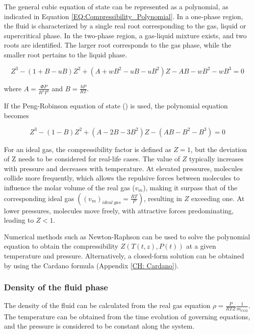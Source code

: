 \documentclass[a4paper,fleqn]{cas-dc}
\begin{document}
The general cubic equation of state can be represented as a polynomial, as indicated in Equation \ref{EQ:Compressibility_Polynomial}. In a one-phase region, the fluid is characterized by a single real root corresponding to the gas, liquid or supercritical phase. In the two-phase region, a gas-liquid mixture exists, and two roots are identified. The larger root corresponds to the gas phase, while the smaller root pertains to the liquid phase.

{\footnotesize
	\begin{equation}
		\label{EQ:Compressibility_Polynomial}
		Z^3 - (1+B-uB)Z^2+(A+wB^2-uB-uB^2)Z - AB - wB^2 - wB^3 = 0
\end{equation} }

where $A=\frac{\Phi P}{R^2T^2}$ and $B=\frac{bP}{RT}$.

If the Peng-Robinson equation of state (\citet{Peng1976}) is used, the polynomial equation becomes

{\footnotesize
	\begin{equation}
		\label{EQ:Peng_Robinson_Polynomial}
		Z^3 - (1-B)Z^2+(A-2B-3B^2)Z -(AB-B^2-B^3) = 0
\end{equation} }

For an ideal gas, the compressibility factor is defined as $Z = 1$, but the deviation of Z needs to be considered for real-life cases. The value of $Z$ typically increases with pressure and decreases with temperature. At elevated pressures, molecules collide more frequently, which allows the repulsive forces between molecules to influence the molar volume of the real gas ($v_m$), making it surpass that of the corresponding ideal gas $\left( \left(v_m\right)_{ideal~gas} = \frac{RT}{P} \right)$, resulting in $Z$ exceeding one. At lower pressures, molecules move freely, with attractive forces predominating, leading to $Z < 1$.

Numerical methods such as Newton-Raphson can be used to solve the polynomial equation to obtain the compressibility $Z\left(T(t,z), P(t)\right)$ at a given temperature and pressure. Alternatively, a closed-form solution can be obtained by using the Cardano formula (Appendix \ref{CH: Cardano}).

\subsubsection{Density of the fluid phase} \label{subsubsec: Fluid density}

The density of the fluid can be calculated from the real gas equation $\rho = \frac{P}{RTZ} \frac{1}{m_{CO2}}$. The temperature can be obtained from the time evolution of governing equations, and the pressure is considered to be constant along the system. 
\end{document}
